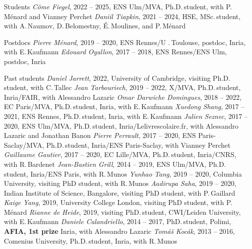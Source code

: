 \documentclass{resume}
\begin{document}
\begin{category}{Students}
\citembullet  \emph{C\^{o}me Fiegel}, 2022 -- 2025, ENS Ulm/MVA,  Ph.D.\,student, with P.\,M\'enard and Vianney Perchet
\citembullet  \emph{Daniil Tiapkin}, 2021 -- 2024, HSE,  MSc.\,student, with A.\,Naumov, D.\,Belomestny, \'E.\,Moulines, and P.\,M\'enard 
\end{category}

\begin{category}{Postdocs}
\citembullet \textit{Pierre M\'enard}, 2019 -- 2020,  ENS Rennes/U .\,Toulouse, postdoc, Inria, with E.\,Kaufmann 
\citembullet \textit{Edouard Oyallon}, 2017 -- 2018,  ENS Rennes/ENS Ulm, postdoc, Inria 
\end{category}


\begin{category}{Past students}
\citembullet \textit{Daniel Jarrett}, 2022, University of Cambridge, visiting Ph.D.\,student, with C.\,Tallec
\citembullet \textit{Jean Tarbouriech}, 2019 -- 2022,  X/MVA, Ph.D.\,student,
Inria/FAIR, with Alessandro Lazaric
\citembullet \textit{Omar Darwiche Domingues}, 2018 -- 2022,  EC Paris/MVA, Ph.D.\,student,
Inria, with E.\,Kaufmann
\citembullet \textit{Xuedong Shang}, 2017 -- 2021,  ENS Rennes, Ph.D.\,student,
Inria, with E.\,Kaufmann
\citembullet \textit{Julien Seznec}, 2017 -- 2020, ENS Ulm/MVA, Ph.D.\,student,
Inria/Lelivrescolaire.fr, with Alessandro Lazaric and Jonathan Banon
\citembullet \textit{Pierre Perrault},  2017 -- 2020, ENS Paris-Saclay/MVA, Ph.D.\,student,
Inria/ENS Paris-Saclay, with Vianney Perchet
\citembullet \textit{Guillaume Gautier},  2017 -- 2020, EC Lille/MVA, Ph.D.\,student,
Inria/CNRS, with R.\,Bardenet
\citembullet \textit{Jean-Bastien Grill}, 2014 -- 2019, ENS Ulm/MVA, Ph.D.\,student,
Inria/ENS Paris, with R.\,Munos
\citembullet \textit{Yunhao Tang}, 2019 -- 2020, Columbia University, visiting PhD student, with R.\,Munos
\citembullet \textit{Aadirupa Saha}, 2019 -- 2020, Indian Institute of Science, Bangalore, visiting PhD student, with P.\,Gaillard
\citembullet \textit{Kaige Yang}, 2019, University College London, visiting PhD student, with P.\,M\'enard
\citembullet \textit{Rianne de Heide}, 2019, visiting PhD.\,student, CWI/Leiden University, with E.\,Kaufmann
\citembullet \textit{Daniele Calandriello}, 2014 -- 2017, PhD.\,student, Polimi, \textbf{AFIA, 1st prize}
Inria, with Alessandro Lazaric
\citembullet \textit{Tom\'a\v s Koc\' ak}, 2013 -- 2016, Comenius University, Ph.D.\,student,
Inria, with R.\,Munos


\end{category}
\end{document}
